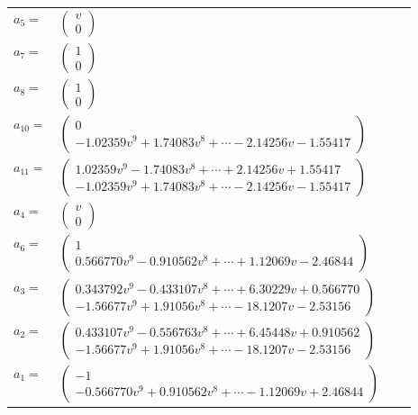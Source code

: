 \documentclass[1p]{elsarticle_modified}
\theoremstyle{definition}
\begin{document}
\begin{tabular}{m{7pt} m{180pt} m{7pt} m{180pt} }
\flushright $a_{5}=$&$\begin{pmatrix}v\\0\end{pmatrix}$ \\
\flushright $a_{7}=$&$\begin{pmatrix}1\\0\end{pmatrix}$ \\
\flushright $a_{8}=$&$\begin{pmatrix}1\\0\end{pmatrix}$ \\
\flushright $a_{10}=$&$\begin{pmatrix}0\\-1.02359 v^{9}+1.74083 v^{8}+\cdots-2.14256 v-1.55417\end{pmatrix}$ \\
\flushright $a_{11}=$&$\begin{pmatrix}1.02359 v^{9}-1.74083 v^{8}+\cdots+2.14256 v+1.55417\\-1.02359 v^{9}+1.74083 v^{8}+\cdots-2.14256 v-1.55417\end{pmatrix}$ \\
\flushright $a_{4}=$&$\begin{pmatrix}v\\0\end{pmatrix}$ \\
\flushright $a_{6}=$&$\begin{pmatrix}1\\0.566770 v^{9}-0.910562 v^{8}+\cdots+1.12069 v-2.46844\end{pmatrix}$ \\
\flushright $a_{3}=$&$\begin{pmatrix}0.343792 v^{9}-0.433107 v^{8}+\cdots+6.30229 v+0.566770\\-1.56677 v^{9}+1.91056 v^{8}+\cdots-18.1207 v-2.53156\end{pmatrix}$ \\
\flushright $a_{2}=$&$\begin{pmatrix}0.433107 v^{9}-0.556763 v^{8}+\cdots+6.45448 v+0.910562\\-1.56677 v^{9}+1.91056 v^{8}+\cdots-18.1207 v-2.53156\end{pmatrix}$ \\
\flushright $a_{1}=$&$\begin{pmatrix}-1\\-0.566770 v^{9}+0.910562 v^{8}+\cdots-1.12069 v+2.46844\end{pmatrix}$ \\

\end{tabular}
\end{document}
